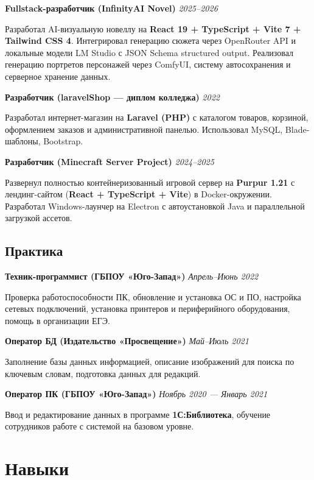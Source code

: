 \documentclass[10pt,a4paper]{article}
\newcommand{\projectEntry}[3]{\textbf{#1} \hfill \textit{#2}\par #3\par\vspace{0.3em}}
\begin{document}
\projectEntry{Fullstack-разработчик (InfinityAI Novel)}{2025--2026}
{Разработал AI-визуальную новеллу на \textbf{React 19 + TypeScript + Vite 7 + Tailwind CSS 4}. Интегрировал генерацию сюжета через OpenRouter API и локальные модели LM Studio с JSON Schema structured output. Реализовал генерацию портретов персонажей через ComfyUI, систему автосохранения и серверное хранение данных.}

\projectEntry{Разработчик (laravelShop --- диплом колледжа)}{2022}
{Разработал интернет-магазин на \textbf{Laravel (PHP)} с каталогом товаров, корзиной, оформлением заказов и административной панелью. Использовал MySQL, Blade-шаблоны, Bootstrap.}

\projectEntry{Разработчик (Minecraft Server Project)}{2024--2025}
{Развернул полностью контейнеризованный игровой сервер на \textbf{Purpur 1.21} с лендинг-сайтом (\textbf{React + TypeScript + Vite}) в Docker-окружении. Разработал Windows-лаунчер на Electron с автоустановкой Java и параллельной загрузкой ассетов.}

\subsection{Практика}

\projectEntry{Техник-программист (ГБПОУ «Юго-Запад»)}{Апрель--Июнь 2022}
{Проверка работоспособности ПК, обновление и установка ОС и ПО, настройка сетевых подключений, установка принтеров и периферийного оборудования, помощь в организации ЕГЭ.}

\projectEntry{Оператор БД (Издательство «Просвещение»)}{Май--Июль 2021}
{Заполнение базы данных информацией, описание изображений для поиска по ключевым словам, подготовка данных для редакций.}

\projectEntry{Оператор ПК (ГБПОУ «Юго-Запад»)}{Ноябрь 2020 --- Январь 2021}
{Ввод и редактирование данных в программе \textbf{1С:Библиотека}, обучение сотрудников работе с системой на базовом уровне.}

\makeEducation

\section{Навыки}
\end{document}
